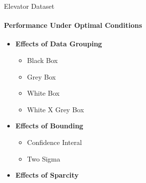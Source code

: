 \documentclass{beamer}
\begin{document}
\begin{frame}[t]{Elevator Dataset}
  \framesubtitle{Performance Under Optimal Conditions}
  \begin{itemize}
    \setlength\itemsep{1em}

  \item \textbf{Effects of Data Grouping}
    \begin{itemize}
      \item Black Box
      \item Grey Box
      \item White Box
      \item White X Grey Box
    \end{itemize}
  \item \textbf{Effects of Bounding}
    \begin{itemize}
      \item Confidence Interal
      \item Two Sigma
    \end{itemize}
  \item \textbf{Effects of Sparcity}
  \end{itemize}
\end{frame}
\end{document}
